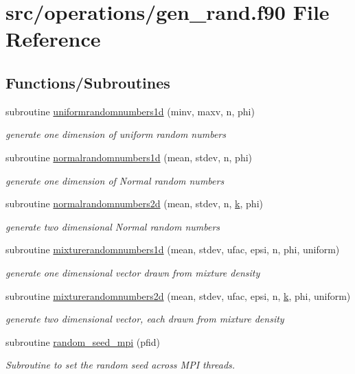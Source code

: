 \hypertarget{gen__rand_8f90}{\section{src/operations/gen\-\_\-rand.f90 File Reference}
\label{gen__rand_8f90}
}
\subsection*{Functions/\-Subroutines}
\begin{DoxyCompactItemize}
\item 
subroutine \hyperlink{gen__rand_8f90_a7cd2e26a4fde81c03cf831511d512bd9}{uniformrandomnumbers1d} (minv, maxv, n, phi)
\begin{DoxyCompactList}\small\item\em generate one dimension of uniform random numbers \end{DoxyCompactList}\item 
subroutine \hyperlink{gen__rand_8f90_a009e8ce631181191ef16c1f99f43a158}{normalrandomnumbers1d} (mean, stdev, n, phi)
\begin{DoxyCompactList}\small\item\em generate one dimension of Normal random numbers \end{DoxyCompactList}\item 
subroutine \hyperlink{gen__rand_8f90_a79c7f64e458a6af30a2fa95a1650c917}{normalrandomnumbers2d} (mean, stdev, n, \hyperlink{operator__wrappers_8f90_aec571ade653c1cf8fd6cde17285af055}{k}, phi)
\begin{DoxyCompactList}\small\item\em generate two dimensional Normal random numbers \end{DoxyCompactList}\item 
subroutine \hyperlink{gen__rand_8f90_ad4c0e9c0f916eb9c4f784239c2768851}{mixturerandomnumbers1d} (mean, stdev, ufac, epsi, n, phi, uniform)
\begin{DoxyCompactList}\small\item\em generate one dimensional vector drawn from mixture density \end{DoxyCompactList}\item 
subroutine \hyperlink{gen__rand_8f90_a5ee81ac6968037e88d3686f9b477b77d}{mixturerandomnumbers2d} (mean, stdev, ufac, epsi, n, \hyperlink{operator__wrappers_8f90_aec571ade653c1cf8fd6cde17285af055}{k}, phi, uniform)
\begin{DoxyCompactList}\small\item\em generate two dimensional vector, each drawn from mixture density \end{DoxyCompactList}\item 
subroutine \hyperlink{gen__rand_8f90_ae9c8b02eca8aa840a34882d0836bcfff}{random\-\_\-seed\-\_\-mpi} (pfid)
\begin{DoxyCompactList}\small\item\em Subroutine to set the random seed across M\-P\-I threads. \end{DoxyCompactList}\end{DoxyCompactItemize}



